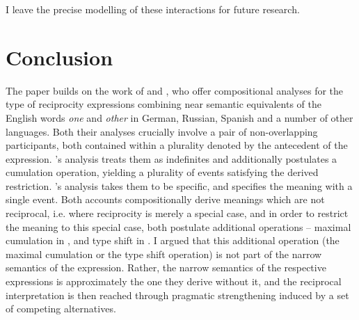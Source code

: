 \documentclass[output=paper,colorlinks,citecolor=brown]{langscibook}
\begin{document}
\noindent I leave the precise modelling of these interactions for future research.

\section{Conclusion}\label{sec:concl}

The paper builds on the work of \citet{v10} and \citet{z14}, who offer compositional analyses for the type of reciprocity expressions combining near semantic equivalents of the English words \textit{one} and \textit{other} in German, Russian, Spanish and a number of other languages. Both their analyses crucially involve a pair of non-overlapping participants, both contained within a plurality denoted by the antecedent of the expression. \citeauthor{v10}'s analysis treats them as indefinites and additionally postulates a cumulation operation, yielding a plurality of events satisfying the derived restriction. \citeauthor{z14}'s analysis takes them to be specific, and specifies the meaning with a single event. Both accounts compositionally derive meanings which are not reciprocal, i.e. where reciprocity is merely a special case, and in order to restrict the meaning to this special case, both postulate additional operations -- maximal cumulation in \citeauthor{v10}, and type shift in \citeauthor{z14}. I argued that this additional operation (the maximal cumulation or the type shift operation) is not part of the narrow semantics of the expression. Rather, the narrow semantics of the respective expressions is approximately the one they derive without it, and the reciprocal interpretation is then reached through pragmatic strengthening induced by a set of competing alternatives. 
\end{document}
